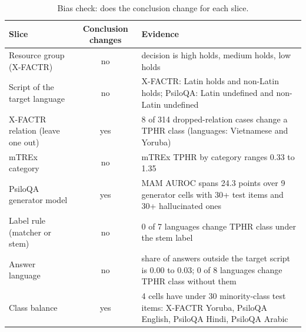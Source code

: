 \begin{table}[!ht]
\tablestyle
\caption{Bias check: does the conclusion change for each slice.}\label{tab:bias}
\begin{tabular}{lcp{200bp}}
\textbf{Slice} & \textbf{Conclusion changes} & \textbf{Evidence} \\
\hline
Resource group (X-FACTR) & no & decision is high holds, medium holds, low holds \\
\hline
Script of the target language & no & X-FACTR: Latin holds and non-Latin holds; PsiloQA: Latin undefined and non-Latin undefined \\
\hline
X-FACTR relation (leave one out) & yes & 8 of 314 dropped-relation cases change a TPHR class (languages: Vietnamese and Yoruba) \\
\hline
mTREx category & no & mTREx TPHR by category ranges 0.33 to 1.35 \\
\hline
PsiloQA generator model & yes & MAM AUROC spans 24.3 points over 9 generator cells with 30+ test items and 30+ hallucinated ones \\
\hline
Label rule (matcher or stem) & no & 0 of 7 languages change TPHR class under the stem label \\
\hline
Answer language & no & share of answers outside the target script is 0.00 to 0.03; 0 of 8 languages change TPHR class without them \\
\hline
Class balance & yes & 4 cells have under 30 minority-class test items: X-FACTR Yoruba, PsiloQA English, PsiloQA Hindi, PsiloQA Arabic
\end{tabular}
\end{table}

